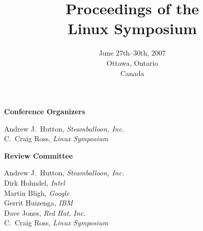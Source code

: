 \documentclass[twoside,12pt]{book}
\begin{document}
\frontmatter


\title{Proceedings of the\\
Linux Symposium}
\author{\vspace{4in}}
\date{June 27th--30th, 2007\\
 Ottawa, Ontario\\
 Canada}
\maketitle
\thispagestyle{empty}
\clearpage


\vspace{2cm}

\textbf{{\Large Conference Organizers}}

\vspace{5mm}
\begin{large}
\begin{raggedright}
\hspace*{0.5in}Andrew J.\ Hutton, \textit{Steamballoon, Inc.}\\
\hspace*{0.5in}C.\ Craig Ross, \textit{Linux Symposium}
\end{raggedright}
\end{large}

\vspace{1cm}
\textbf{{\Large Review Committee}}

\vspace{5mm}
\begin{large}
\begin{raggedright}
\hspace*{0.5in}Andrew J.\ Hutton, \textit{Steamballoon, Inc.}\\
\hspace*{0.5in}Dirk Hohndel, \textit{Intel}\\
\hspace*{0.5in}Martin Bligh, \textit{Google}\\
\hspace*{0.5in}Gerrit Huizenga, \textit{IBM}\\
\hspace*{0.5in}Dave Jones, \textit{Red Hat, Inc.}\\
\hspace*{0.5in}C.\ Craig Ross, \textit{Linux Symposium}\\
\end{raggedright}
\end{large}
\end{document}
